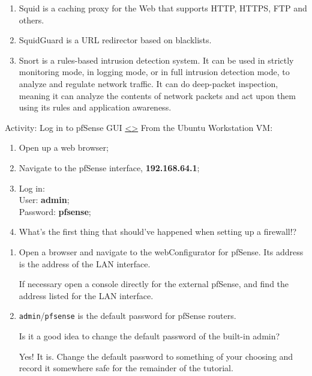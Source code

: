 \documentclass[12pt]{extarticle}
\newenvironment{instructionblock}{\Large\bgroup}{\egroup}
\newcommand{\ben}{\begin{enumerate}}
\newcommand{\een}{\end{enumerate}}
\begin{document}
\ben
   \item Squid is a caching proxy for the Web that supports HTTP, HTTPS, FTP and others.\cite{Squid2017Squid-cache}
   \item SquidGuard is a URL redirector based on blacklists.
   \item Snort is a rules-based intrusion detection system. It can be used in strictly monitoring mode, in logging mode, or in full intrusion detection mode, to analyze and regulate network traffic. It can do deep-packet inspection, meaning it can analyze the contents of network packets and act upon them using its rules and application awareness.
\een







\pagebreak
\begin{slide}{ Activity: Log in to pfSense GUI }{ \hyperref[slide 6]{\textless}\hyperref[slide 8]{\textgreater} }
\vskip 5pt
\begin{instructionblock}
From the Ubuntu Workstation VM:
\begin{enumerate}
    \item Open up a web browser;
    \item Navigate to the pfSense interface, \textbf{192.168.64.1};
    \item Log in:\\
    User: \textbf{admin};\\
    Password: \textbf{pfsense};
    \item What's the first thing that should've happened when setting up a firewall!?
\end{enumerate}
\end{instructionblock}
\end{slide}


\vspace{8mm}
\begin{enumerate}[2]
\item Open a browser and navigate to the webConfigurator for pfSense. Its address is the address of the LAN interface.

If necessary open a console directly for the external pfSense, and find the address listed for the LAN interface.
\item \texttt{admin}/\texttt{pfsense} is the default password for pfSense routers. 

Is it a good idea to change the default password of the built-in admin?

Yes! It is. Change the default password to something of your choosing and record it somewhere safe for the remainder of the tutorial.
\end{enumerate}
\end{document}
